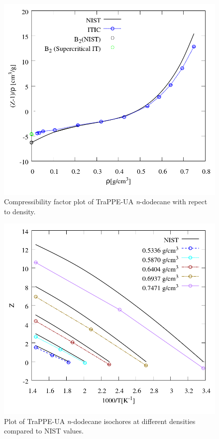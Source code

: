 \documentclass[%
 aip,
 jcp,
 sd,%
 amsmath,amssymb,
]{revtex4-1}
\begin{document}

\begin{figure}[!htbp]
\includegraphics[scale=0.35]{Figures/EXAMPLE-SIM_TraPPE-C12_zrho.png}
\caption{Compressibility factor plot of TraPPE-UA \textit{n}-dodecane with repect to density. }
\label{fig:EXAMPLE-SIM/TraPPE-C12/zrho}
\end{figure}

\begin{figure}[!htbp]
\includegraphics[scale=0.35]{Figures/EXAMPLE-SIM_TraPPE-C12_zt.png}
\caption{Plot of TraPPE-UA \textit{n}-dodecane isochores at different densities compared to NIST values.}
\label{fig:EXAMPLE-SIM/TraPPE-C12/zt}
\end{figure}
\end{document}
